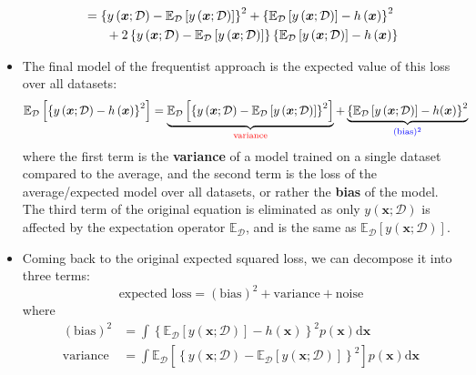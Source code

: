 \begin{itemize}
\begin{equation*}
\begin{split}
			& = \left\{y\left(\bm{x};\mathcal{D}\right) - \mathbb{E}_{\mathcal{D}}\left[y\left(\bm{x};\mathcal{D}\right)\right]\right\}^2 + \left\{\mathbb{E}_{\mathcal{D}}\left[y\left(\bm{x};\mathcal{D}\right)\right] - h\left(\bm{x}\right)\right\}^2 \\
			& \text{\hspace{5mm} } + 2\left\{y\left(\bm{x};\mathcal{D}\right) - \mathbb{E}_{\mathcal{D}}\left[y\left(\bm{x};\mathcal{D}\right)\right]\right\}\left\{ \mathbb{E}_{\mathcal{D}}\left[y\left(\bm{x};\mathcal{D}\right)\right] - h\left(\bm{x}\right)\right\}
		\end{split}
	\end{equation*}
	\item The final model of the frequentist approach is the expected value of this loss over all datasets:
	\begin{equation*}
		\begin{split}
			\mathbb{E}_{\mathcal{D}}\left[\left\{y\left(\bm{x};\mathcal{D}\right) - h\left(\bm{x}\right)\right\}^2\right] & = \underbrace{\mathbb{E}_{\mathcal{D}}\left[\left\{y\left(\bm{x};\mathcal{D}\right) - \mathbb{E}_{\mathcal{D}}\left[y\left(\bm{x};\mathcal{D}\right)\right]\right\}^2\right]}_{\text{\textcolor{red}{variance}}} + \underbrace{\left\{\mathbb{E}_{\mathcal{D}}\left[y\left(\bm{x};\mathcal{D}\right)\right] - h(\bm{x})\right\}^2}_{\textcolor{blue}{(\text{bias})^2}}
		\end{split}
	\end{equation*}
	where the first term is the \textbf{variance} of a model trained on a single dataset compared to the average, and the second term is the loss of the average/expected model over all datasets, or rather the \textbf{bias} of the model. The third term of the original equation is eliminated as only $y(\bm{x};\mathcal{D})$ is affected by the expectation operator $\mathbb{E}_{\mathcal{D}}$, and is the same as $\mathbb{E}_{\mathcal{D}}\left[y\left(\bm{x};\mathcal{D}\right)\right]$. 
	\item Coming back to the original expected squared loss, we can decompose it into three terms:
	$$\text{expected loss} = (\text{bias})^2 + \text{variance} + \text{noise}$$
	where
	\begin{equation*}
		\begin{split}
			(\text{bias})^2 &= \int \left\{\mathbb{E}_{\mathcal{D}}\left[y\left(\bm{x};\mathcal{D}\right)\right] - h(\bm{x})\right\}^2p(\bm{x}) \text{d}\bm{x}\\
			\text{variance} &= \int \mathbb{E}_{\mathcal{D}}\left[\left\{y\left(\bm{x};\mathcal{D}\right) - \mathbb{E}_{\mathcal{D}}\left[y\left(\bm{x};\mathcal{D}\right)\right]\right\}^2\right]p(\bm{x}) \text{d}\bm{x}\\

\end{split}
\end{equation*}
\end{itemize}

